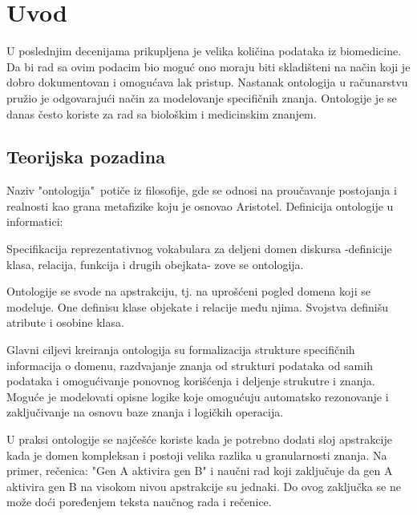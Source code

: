 \section{Uvod}
\label{sec:uvod}

U poslednjim decenijama prikupljena je velika količina podataka iz biomedicine.
Da bi rad sa ovim podacim bio moguć ono moraju biti skladišteni na način koji je
dobro dokumentovan i omogućava lak pristup.
Nastanak ontologija u računarstvu pružio je odgovarajući način za modelovanje specifičnih znanja.
Ontologije je se danas često koriste za rad sa biološkim i medicinskim znanjem.

\subsection{Teorijska pozadina}

	Naziv "ontologija"\  potiče iz filosofije, gde se odnosi na proučavanje postojanja i realnosti
kao grana metafizike koju je osnovao Aristotel.
Definicija ontologije u informatici:
\begin{displayquote}
Specifikacija reprezentativnog vokabulara za deljeni domen diskursa
-definicije klasa, relacija, funkcija i drugih obejkata-
zove se ontologija.
\end{displayquote}

Ontologije se svode na apstrakciju, tj. na uprošćeni pogled domena koji se modeluje.
One definisu klase objekate i relacije među njima. Svojstva definišu atribute i osobine klasa.
\par

Glavni ciljevi kreiranja ontologija su formalizacija strukture specifičnih informacija o domenu,
razdvajanje znanja od strukturi podataka od samih podataka i omogućivanje ponovnog korišćenja 
i deljenje strukutre i znanja.
Moguće je modelovati opisne logike koje omogućuju automatsko rezonovanje i zaključivanje
na osnovu baze znanja i logičkih operacija.
\par

U praksi ontologije se najčešće koriste kada je potrebno dodati sloj apstrakcije
kada je domen kompleksan i postoji velika razlika u granularnosti znanja.
Na primer, rečenica: "Gen A aktivira gen B" i naučni rad koji zaključuje da gen A
aktivira gen B na visokom nivou apstrakcije su jednaki. Do ovog zaključka se ne može
doći poređenjem teksta naučnog rada i rečenice.
